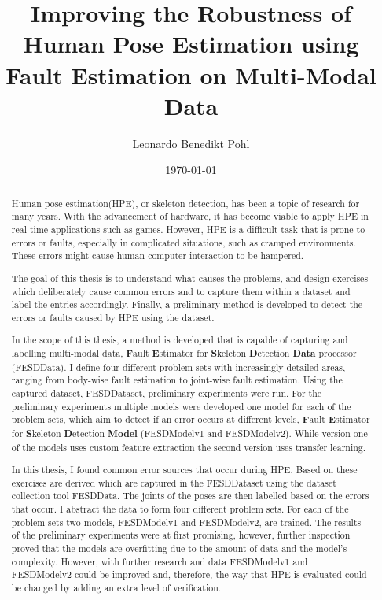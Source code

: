 
\title{Improving the Robustness of Human Pose Estimation using Fault Estimation on Multi-Modal Data}
\author{Leonardo Benedikt Pohl}
\date{\today}
 
\newlength{\originalVOffset}
\newlength{\originalHOffset}
\setlength{\originalVOffset}{\voffset}   
\setlength{\originalHOffset}{\hoffset}

\setlength{\voffset}{0cm}
\setlength{\hoffset}{0cm}

\setlength{\voffset}{\originalVOffset}
\setlength{\hoffset}{\originalHOffset}

\cleardoublepage

\begin{abstract}  
  Human pose estimation(HPE), or skeleton detection, has been a topic of research for many years. With the advancement of hardware, it has become viable to apply HPE in real-time applications such as games. However, HPE is a difficult task that is prone to errors or faults, especially in complicated situations, such as cramped environments. These errors might cause human-computer interaction to be hampered.

  The goal of this thesis is to understand what causes the problems, and design exercises which deliberately cause common errors and to capture them within a dataset and label the entries accordingly. Finally, a preliminary method is developed to detect the errors or faults caused by HPE using the dataset.

  In the scope of this thesis, a method is developed that is capable of capturing and labelling multi-modal data, \textbf{F}ault \textbf{E}stimator for \textbf{S}keleton \textbf{D}etection \textbf{Data} processor (FESDData). I define four different problem sets with increasingly detailed areas, ranging from body-wise fault estimation to joint-wise fault estimation. Using the captured dataset, FESDDataset, preliminary experiments were run. For the preliminary experiments multiple models were developed one model for each of the problem sets, which aim to detect if an error occurs at different levels, \textbf{F}ault \textbf{E}stimator for \textbf{S}keleton \textbf{D}etection \textbf{Model} (FESDModelv1 and FESDModelv2). While version one of the models uses custom feature extraction the second version uses transfer learning.

  In this thesis, I found common error sources that occur during HPE. Based on these exercises are derived which are captured in the FESDDataset using the dataset collection tool FESDData. The joints of the poses are then labelled based on the errors that occur. I abstract the data to form four different problem sets. For each of the problem sets two models, FESDModelv1 and FESDModelv2, are trained. The results of the preliminary experiments were at first promising, however, further inspection proved that the models are overfitting due to the amount of data and the model's complexity. However, with further research and data FESDModelv1 and FESDModelv2 could be improved and, therefore, the way that HPE is evaluated could be changed by adding an extra level of verification.

\end{abstract}
